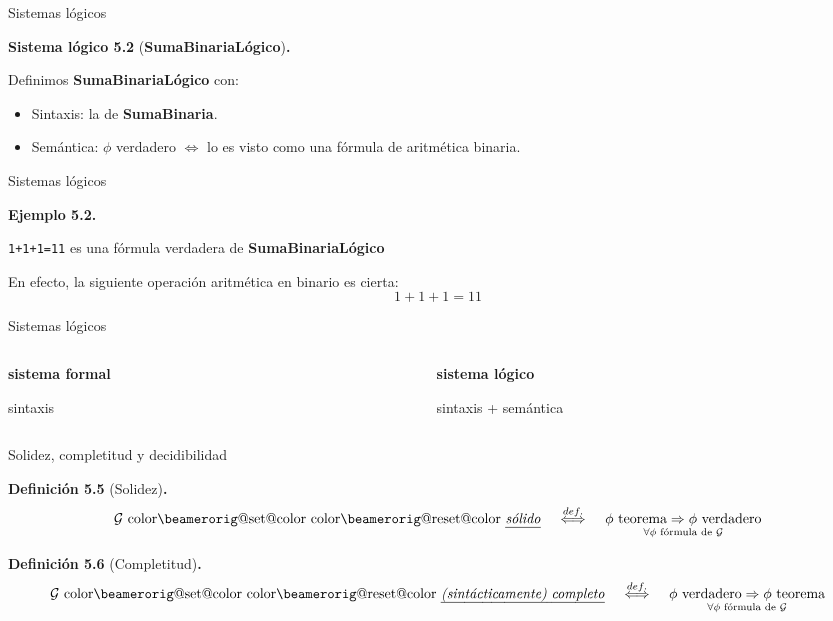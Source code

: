 \documentclass[10pt,xcolor=dvipsnames,aspectratio=169,spanish]{beamer}
\makeatletter
\let\HL\hl
\renewcommand\hl{%
  \let\set@color\beamerorig@set@color
  \let\reset@color\beamerorig@reset@color
  \HL}
\newcommand{\hle}[1]{\hl{\emph{#1}}}
\makeatother
\begin{document}
\begin{frame}{Sistemas lógicos}

\textbf{Sistema lógico 5.2} (\textbf{SumaBinariaLógico})\textbf{.}

Definimos \textbf{SumaBinariaLógico} con:

\begin{itemize}
    \item Sintaxis: la de \textbf{SumaBinaria}.
    \item Semántica: $\phi$ verdadero $\iff$ lo es visto como una fórmula de aritmética binaria.
\end{itemize}

\end{frame}


\begin{frame}{Sistemas lógicos}

\textbf{Ejemplo 5.2.}

\begin{center}
    \texttt{1+1+1=11} es una fórmula verdadera de \textbf{SumaBinariaLógico}
\end{center}

En efecto, la siguiente operación aritmética en binario es cierta:
$$1+1+1=11$$

\end{frame}

\begin{frame}{Sistemas lógicos}

\begin{columns}
\begin{column}{0.35\textwidth}
\begin{center}
    \Large
    \textbf{sistema formal}

    sintaxis
\end{center}
\end{column}
\begin{column}{0.35\textwidth}  %
\begin{center}
    \Large
    \textbf{sistema lógico}

    sintaxis + semántica
\end{center}
\end{column}
\end{columns}

\end{frame}

\begin{frame}{Solidez, completitud y decidibilidad}

\textbf{Definición 5.5} (Solidez)\textbf{.}
{\large $$\mathcal{G}\text{ \hle{sólido}} \;\;\; \stackrel{def.}{\iff} \;\;\; \underset{\forall \phi \text{ fórmula de }\mathcal{G}}{\phi \text{ teorema} \Rightarrow \phi\text{ verdadero}}$$}

\textbf{Definición 5.6} (Completitud)\textbf{.}
{\large $$\mathcal{G}\text{ \hle{(sintácticamente) completo}} \;\;\; \stackrel{def.}{\iff} \;\;\; \underset{\forall \phi \text{ fórmula de }\mathcal{G}}{\phi \text{ verdadero} \Rightarrow \phi\text{ teorema}}$$}

\end{frame}
\end{document}
